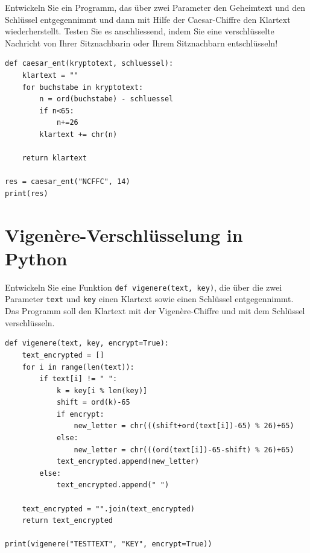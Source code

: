 \begin{myexercise}
    Entwickeln Sie ein Programm, das über zwei Parameter den Geheimtext und den Schlüssel entgegennimmt und dann mit Hilfe der Caesar-Chiffre den Klartext wiederherstellt. Testen Sie es anschliessend, indem Sie eine verschlüsselte Nachricht von Ihrer Sitznachbarin oder Ihrem Sitznachbarn entschlüsseln!

    \begin{myanswer}
        \begin{lstlisting}
def caesar_ent(kryptotext, schluessel):
    klartext = ""
    for buchstabe in kryptotext:
        n = ord(buchstabe) - schluessel
        if n<65:
            n+=26
        klartext += chr(n)

    return klartext

res = caesar_ent("NCFFC", 14)
print(res)
\end{lstlisting}
    \end{myanswer}
\end{myexercise}

\section{Vigenère-Verschlüsselung in Python}

\begin{myexercise}\label{ex:vig}
    Entwickeln Sie eine Funktion \lstinline|def vigenere(text, key)|, die über die zwei Parameter \lstinline|text| und \lstinline|key| einen Klartext sowie einen Schlüssel entgegennimmt. Das Programm soll den Klartext mit der Vigenère-Chiffre und mit dem Schlüssel verschlüsseln.
    \begin{myanswer}
        \begin{lstlisting}
def vigenere(text, key, encrypt=True):
    text_encrypted = []
    for i in range(len(text)):
        if text[i] != " ":
            k = key[i % len(key)]
            shift = ord(k)-65
            if encrypt:
                new_letter = chr(((shift+ord(text[i])-65) % 26)+65)
            else:
                new_letter = chr(((ord(text[i])-65-shift) % 26)+65)
            text_encrypted.append(new_letter)
        else:
            text_encrypted.append(" ")

    text_encrypted = "".join(text_encrypted)
    return text_encrypted

print(vigenere("TESTTEXT", "KEY", encrypt=True))
\end{lstlisting}
    \end{myanswer}
\end{myexercise}

